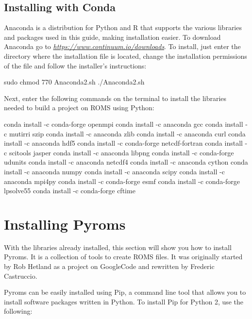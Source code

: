 \subsection{Installing with Conda}\label{condasec}
\bigskip
\noindent Anaconda is a distribution for Python and R that supports the various libraries and packages used in this guide, 
making installation easier. To download Anaconda go to
\textcolor{bleu_cite}{\href{https://www.continuum.io/downloads}{\textit{https://www.continuum.io/downloads}}}. 
To install, just enter the directory where the installation file is located, change the installation permissions of the file and 
follow the installer's instructions:
\bigskip

\begin{bashcode}
 sudo chmod 770 Anaconda2.sh
 ./Anaconda2.sh
\end{bashcode}
\bigskip

\noindent Next, enter the following commands on the terminal to install the libraries needed to build a project on ROMS using Python:
\bigskip

\begin{bashcode}
conda install -c conda-forge openmpi
conda install -c anaconda gcc
conda install -c mutirri szip
conda install -c anaconda zlib
conda install -c anaconda curl
conda install -c anaconda hdf5
conda install -c conda-forge netcdf-fortran
conda install -c scitools jasper
conda install -c anaconda libpng
conda install -c conda-forge udunits
conda install -c anaconda netcdf4
conda install -c anaconda cython
conda install -c anaconda numpy
conda install -c anaconda scipy
conda install -c anaconda mpi4py
conda install -c conda-forge esmf
conda install -c conda-forge lpsolve55 
conda install -c conda-forge cftime
\end{bashcode}
\bigskip

\section{Installing Pyroms}
\bigskip

\noindent With the libraries already installed, this section will show you how to install Pyroms. 
It is a collection of tools to create ROMS files. It was originally started by Rob Hetland as a project on GoogleCode and 
rewritten by Frederic Castruccio.
\bigskip

\noindent Pyroms can be easily installed using Pip, a command line tool that allows you to install software packages written in Python.
To install Pip for Python 2, use the following:
\bigskip


